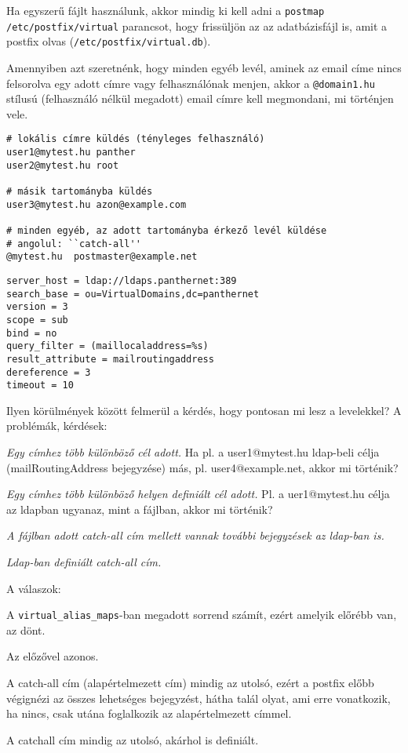 Ha egyszerű fájlt használunk, akkor mindig ki kell adni a \texttt{postmap /etc/postfix/virtual} parancsot, hogy
frissüljön az az adatbázisfájl is, amit a postfix olvas (\texttt{/etc/postfix/virtual.db}).

Amennyiben azt szeretnénk, hogy minden egyéb levél, aminek az email címe nincs felsorolva egy adott címre vagy
felhasználónak menjen, akkor a \texttt{@domain1.hu} stílusú (felhasználó nélkül megadott) email címre kell megmondani,
mi történjen vele.

\begin{Verbatim}[frame=single,label=virtual]
# lokális címre küldés (tényleges felhasználó)
user1@mytest.hu panther
user2@mytest.hu root

# másik tartományba küldés
user3@mytest.hu azon@example.com

# minden egyéb, az adott tartományba érkező levél küldése
# angolul: ``catch-all''
@mytest.hu  postmaster@example.net
\end{Verbatim}

\begin{Verbatim}[frame=single,label=virtual-ldap-domains.conf]
server_host = ldap://ldaps.panthernet:389
search_base = ou=VirtualDomains,dc=panthernet
version = 3
scope = sub
bind = no
query_filter = (maillocaladdress=%s)
result_attribute = mailroutingaddress
dereference = 3
timeout = 10
\end{Verbatim}


Ilyen körülmények között felmerül a kérdés, hogy pontosan mi lesz a levelekkel? A problémák, kérdések:

\begin{enumzjr}
  \item \emph{Egy címhez több különböző cél adott.} Ha pl. a user1@mytest.hu ldap-beli célja (mailRoutingAddress
  bejegyzése) más, pl. user4@example.net, akkor mi történik?
  \item \emph{Egy címhez több különböző helyen definiált cél adott.} Pl. a uer1@mytest.hu célja az ldapban ugyanaz, mint
  a fájlban, akkor mi történik?
  \item \emph{A fájlban adott catch-all cím mellett vannak további bejegyzések az ldap-ban is.}
  \item \emph{Ldap-ban definiált catch-all cím.}
\end{enumzjr}

A válaszok:

\begin{enumzjr}
  \item A \texttt{virtual\_alias\_maps}-ban megadott sorrend számít, ezért amelyik előrébb van, az dönt.
  \item Az előzővel azonos.
  \item A catch-all cím (alapértelmezett cím) mindig az utolsó, ezért a postfix előbb végignézi az összes lehetséges
    bejegyzést, hátha talál olyat, ami erre vonatkozik, ha nincs, csak utána foglalkozik az alapértelmezett címmel.
  \item A catchall cím mindig az utolsó, akárhol is definiált.
\end{enumzjr}


